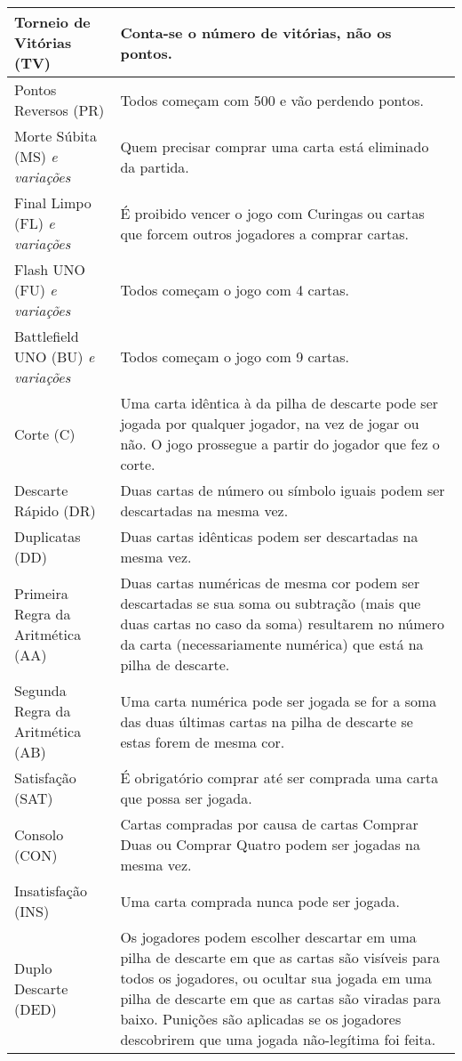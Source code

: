 \begin{center}
\begin{longtable}{|p{4cm}|p{5cm}|}
\hline
Torneio de Vitórias (TV) & Conta-se o número de vitórias, não os pontos. \\ \hline
Pontos Reversos (PR) & Todos começam com 500 e vão perdendo pontos. \\ \hline
Morte Súbita (MS) \emph{e variações} & Quem precisar comprar uma carta está eliminado da partida. \\ \hline
Final Limpo (FL) \emph{e variações} & É proibido vencer o jogo com Curingas ou cartas que forcem outros jogadores a comprar cartas. \\ \hline
Flash UNO (FU) \emph{e variações} & Todos começam o jogo com 4 cartas. \\ \hline
Battlefield UNO (BU) \emph{e variações} & Todos começam o jogo com 9 cartas. \\ \hline
Corte (C) & Uma carta idêntica à da pilha de descarte pode ser jogada por qualquer jogador, na vez de jogar ou não. O jogo prossegue a partir do jogador que fez o corte. \\ \hline
Descarte Rápido (DR) & Duas cartas de número ou símbolo iguais podem ser descartadas na mesma vez. \\ \hline
Duplicatas (DD) & Duas cartas idênticas podem ser descartadas na mesma vez. \\ \hline
Primeira Regra da Aritmética (AA) & Duas cartas numéricas de mesma cor podem ser descartadas se sua soma ou subtração (mais que duas cartas no caso da soma) resultarem no número da carta (necessariamente numérica) que está na pilha de descarte. \\ \hline
Segunda Regra da Aritmética (AB) & Uma carta numérica pode ser jogada se for a soma das duas últimas cartas na pilha de descarte se estas forem de mesma cor. \\ \hline
Satisfação (SAT) & É obrigatório comprar até ser comprada uma carta que possa ser jogada. \\ \hline
Consolo (CON) & Cartas compradas por causa de cartas Comprar Duas ou Comprar Quatro podem ser jogadas na mesma vez. \\ \hline
Insatisfação (INS) & Uma carta comprada nunca pode ser jogada. \\ \hline
Duplo Descarte (DED) & Os jogadores podem escolher descartar em uma pilha de descarte em que as cartas são visíveis para todos os jogadores, ou ocultar sua jogada em uma pilha de descarte em que as cartas são viradas para baixo. Punições são aplicadas se os jogadores descobrirem que uma jogada não-legítima foi feita. \\ \hline

\end{longtable}
\end{center}
